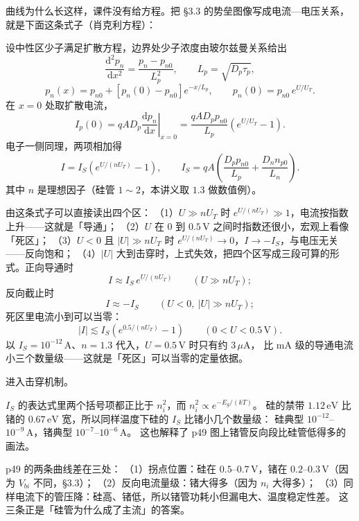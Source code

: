 \documentclass[11pt]{ctexart}
\begin{document}
曲线为什么长这样，课件没有给方程。把 §3.3 的势垒图像写成电流—电压关系，
就是下面这条式子（肖克利方程）：

\begin{center}
\begin{minipage}{0.96\linewidth}
设中性区少子满足扩散方程，边界处少子浓度由玻尔兹曼关系给出
\[
\frac{\mathrm{d}^2p_n}{\mathrm{d}x^2}=\frac{p_n-p_{n0}}{L_p^2},
\qquad L_p=\sqrt{D_p\tau_p},
\]
\[
p_n(x)=p_{n0}+\left[p_n(0)-p_{n0}\right]e^{-x/L_p},
\qquad p_n(0)=p_{n0}\,e^{U/U_T}.
\]
在 $x=0$ 处取扩散电流，
\[
I_p(0)=qA D_p\left.\frac{\mathrm{d}p_n}{\mathrm{d}x}\right|_{x=0}
=\frac{qA D_p p_{n0}}{L_p}\left(e^{U/U_T}-1\right).
\]
电子一侧同理，两项相加得
\[
I=I_S\left(e^{U/(nU_T)}-1\right),
\qquad
I_S=qA\left(\frac{D_p p_{n0}}{L_p}+\frac{D_n n_{p0}}{L_n}\right).
\]
其中 $n$ 是理想因子（硅管 $1\sim2$，本讲义取 $1.3$ 做数值例）。
\end{minipage}
\end{center}

由这条式子可以直接读出四个区：
（1）$U\gg nU_T$ 时 $e^{U/(nU_T)}\gg1$，电流按指数上升——这就是「导通」；
（2）$U$ 在 $0$ 到 $0.5\,\mathrm{V}$ 之间时指数还很小，宏观上看像「死区」；
（3）$U<0$ 且 $|U|\gg nU_T$ 时 $e^{U/(nU_T)}\to0$，$I\to-I_S$，与电压无关——反向饱和；
（4）$|U|$ 大到击穿时，上式失效，把四个区写成三段可算的形式。正向导通时
\[
I\approx I_S\,e^{U/(nU_T)}\qquad(U\gg nU_T);
\]
反向截止时
\[
I\approx-I_S\qquad(U<0,\ |U|\gg nU_T);
\]
死区里电流小到可以当零：
\[
|I|\lesssim I_S\left(e^{0.5/(nU_T)}-1\right)\qquad(0<U<0.5\,\mathrm{V}).
\]
以 $I_S=10^{-12}\,\mathrm{A}$、$n=1.3$ 代入，$U=0.5\,\mathrm{V}$ 时只有约 $3\,\mu\mathrm{A}$，
比 mA 级的导通电流小三个数量级——这就是「死区」可以当零的定量依据。

进入击穿机制。


$I_S$ 的表达式里两个括号项都正比于 $n_i^2$，而 $n_i^2\propto e^{-E_g/(kT)}$。
硅的禁带 $1.12\,\mathrm{eV}$ 比锗的 $0.67\,\mathrm{eV}$ 宽，所以同样温度下硅的 $I_S$ 比锗小几个数量级：
硅典型 $10^{-12}$--$10^{-9}\,\mathrm{A}$，锗典型 $10^{-7}$--$10^{-6}\,\mathrm{A}$。
这也解释了 p49 图上锗管反向段比硅管低得多的画法。


p49 的两条曲线差在三处：
（1）拐点位置：硅在 $0.5$--$0.7\,\mathrm{V}$，锗在 $0.2$--$0.3\,\mathrm{V}$（因为 $V_{bi}$ 不同，§3.3）；
（2）反向电流量级：锗大得多（因为 $n_i$ 大得多）；
（3）同样电流下的管压降：硅高、锗低，所以锗管功耗小但漏电大、温度稳定性差。
这三条正是「硅管为什么成了主流」的答案。
\end{document}
